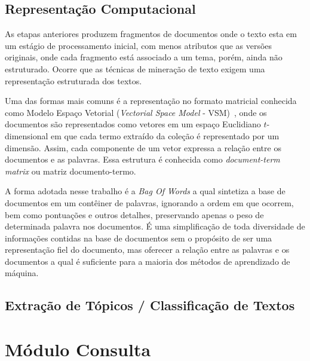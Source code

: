 \subsection{Representação Computacional}

As etapas anteriores produzem fragmentos de documentos onde o texto esta em um estágio de processamento inicial, com menos atributos que as versões originais, onde cada fragmento está associado a um tema, porém, ainda não estruturado. Ocorre que as técnicas de mineração de texto exigem uma representação estruturada dos textos. %

Uma das formas mais comuns é a representação no formato matricial conhecida como Modelo Espaço Vetorial (\textit{Vectorial Space Model} - VSM)~\cite{Rezende2003}, onde os documentos são representados como vetores em um espaço Euclidiano $t$-dimensional em que cada termo extraído da coleção é representado por um dimensão. Assim, cada componente de um vetor expressa a relação entre os documentos e as palavras. Essa estrutura é conhecida como \textit{document-term matrix} ou matriz documento-termo.

A forma adotada nesse trabalho é a \textit{Bag Of Words} a qual sintetiza a base de documentos em um contêiner de palavras, ignorando a ordem em que ocorrem, bem como pontuações e outros detalhes, preservando apenas o peso de determinada palavra nos documentos. É uma simplificação de toda diversidade de informações contidas na base de documentos sem o propósito de ser uma representação fiel do documento, mas oferecer a relação entre as palavras e os documentos a qual é suficiente para a maioria dos métodos de aprendizado de máquina.%






\subsection{Extração de Tópicos / Classificação de Textos}




\section{Módulo Consulta}

